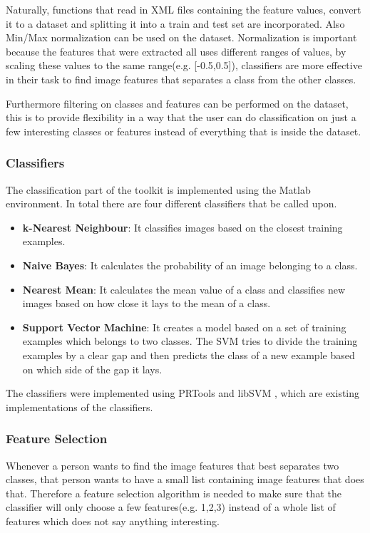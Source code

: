 Naturally, functions that read in XML files containing the feature values, convert it to a dataset and splitting it into a train and test set are incorporated.
Also Min/Max normalization can be used on the dataset.
Normalization is important because the features that were extracted all uses different ranges of values, by scaling these values to the same range(e.g. [-0.5,0.5]), classifiers are more effective in their task to find image features that separates a class from the other classes.

Furthermore filtering on classes and features can be performed on the dataset, this is to provide flexibility in a way that the user can do classification on just a few interesting classes or features instead of everything that is inside the dataset.

\subsubsection{Classifiers}
The classification part of the toolkit is implemented using the Matlab environment. In total there are four different classifiers that be called upon.

\begin{itemize}
	\item \textbf{k-Nearest Neighbour}: It classifies images based on the closest training examples.
	\item \textbf{Naive Bayes}: It calculates the probability of an image belonging to a class. 
	\item \textbf{Nearest Mean}: It calculates the mean value of a class and classifies new images based on how close it lays to the mean of a class.
	\item \textbf{Support Vector Machine}: It creates a model based on a set of training examples which belongs to two classes.
	The SVM tries to divide the training examples by a clear gap and then predicts the class of a new example based on which side of the gap it lays.
\end{itemize}

The classifiers were implemented using PRTools \cite{Duin00prtoolsversion} and libSVM \cite{chang2001libsvm}, which are existing implementations of the classifiers.

\subsubsection{Feature Selection}
Whenever a person wants to find the image features that best separates two classes, that person wants to have a small list containing image features that does that.
Therefore a feature selection algorithm is needed to make sure that the classifier will only choose a few features(e.g. 1,2,3) instead of a whole list of features which does not say anything interesting.

